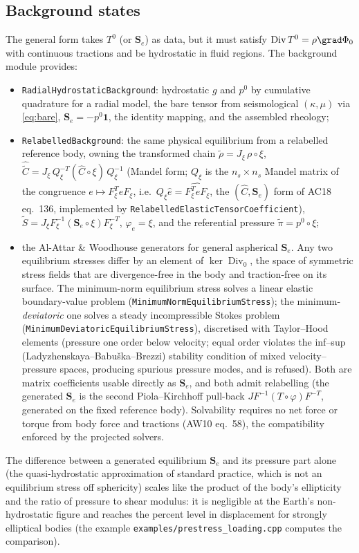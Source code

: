 \documentclass[11pt]{article}
\numberwithin{equation}{section}
\theoremstyle{remark}
\newcommand{\Div}{\operatorname{Div}}
\newcommand{\Ch}{\hat{C}}
\newcommand{\Se}{\mathbf{S}_e}
\newcommand{\code}[1]{\texttt{#1}}
\begin{document}
\subsection{Background states}
\label{sec:background}

The general form takes $T^0$ (or $\Se$) as data, but it must satisfy
$\Div T^0 = \rho\grad\Phi_0$ with continuous tractions and be hydrostatic
in fluid regions. The background module provides:
\begin{itemize}
\item \code{RadialHydrostaticBackground}: hydrostatic $g$ and $p^0$ by
  cumulative quadrature for a radial model, the bare tensor from
  seismological $(\kappa,\mu)$ via \eqref{eq:bare}, $\Se = -p^0\mathbf{1}$,
  the identity mapping, and the assembled rheology;
\item \code{RelabelledBackground}: the same physical equilibrium from a
  relabelled reference body, owning the transformed chain
  $\tilde\rho = J_\xi\,\rho\circ\xi$,
  $\hat{\tilde C} = J_\xi\,Q_\xi^{-T}(\hat C\circ\xi)\,Q_\xi^{-1}$ (Mandel
  form; $Q_\xi$ is the $n_s\times n_s$ Mandel matrix of the congruence
  $e\mapsto F_\xi^TeF_\xi$, i.e.\ $Q_\xi\hat e = \widehat{F_\xi^TeF_\xi}$, the
  $(\Ch,\Se)$ form of AC18 eq.~136, implemented by
  \code{RelabelledElasticTensorCoefficient}),
  $\tilde S = J_\xi F_\xi^{-1}(\Se\circ\xi)F_\xi^{-T}$, $\varphi_e = \xi$,
  and the referential pressure $\tilde\pi = p^0\circ\xi$;
\item the Al-Attar \& Woodhouse \cite{AW10} generators for general
  aspherical $\Se$. Any two equilibrium stresses differ by an element of
  $\ker\Div_0$, the space of symmetric stress fields that are
  divergence-free in the body and traction-free on its surface. The minimum-norm
  equilibrium stress solves a linear elastic boundary-value problem
  (\code{MinimumNormEquilibriumStress}); the minimum-\emph{deviatoric} one
  solves a steady incompressible Stokes problem
  (\code{MinimumDeviatoricEquilibriumStress}), discretised with
  Taylor--Hood elements (pressure one order below velocity; equal order
  violates the inf--sup (Ladyzhenskaya--Babu\v{s}ka--Brezzi) stability
  condition of mixed velocity--pressure spaces, producing spurious pressure
  modes, and is refused). Both are matrix
  coefficients usable directly as $\Se$, and both admit relabelling (the
  generated $\Se$ is the second Piola--Kirchhoff pull-back
  $J F^{-1}(T\circ\varphi)F^{-T}$, generated on the fixed reference body).
  Solvability requires no net force or torque from body force and tractions
  (AW10 eq.~58), the compatibility enforced by the projected solvers.
\end{itemize}
The difference between a generated equilibrium $\Se$ and its pressure
part alone (the quasi-hydrostatic approximation of standard practice,
which is not an equilibrium stress off sphericity) scales like the product
of the body's ellipticity and the ratio of pressure to shear modulus: it is
negligible at the Earth's non-hydrostatic figure and reaches the percent
level in displacement for strongly elliptical bodies (the example
\code{examples/prestress\_loading.cpp} computes the comparison).
\end{document}
